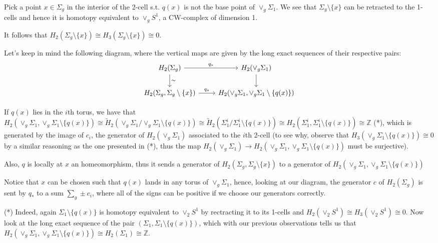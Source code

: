 \documentclass{article}
\newcommand{\numberset}{\mathbb}
\newcommand{\Z}{\numberset{Z}}
\begin{document}
Pick a point $x\in\Sigma_g$ in the interior of the 2-cell s.t. $q(x)$ is not
the base point of $\vee_g\Sigma_1$. We see that $\Sigma_g\setminus\{x\}$ can be
retracted to the 1-cells and hence it is homotopy equivalent to $\vee_g S^1$, a
CW-complex of dimension 1.

It follows that $H_2(\Sigma_g\setminus\{x\})\cong
H_3(\Sigma_g\setminus\{x\})\cong 0$.

Let's keep in mind the following diagram, where the vertical maps are given by the
long exact sequences of their respective pairs:
\[
    \begin{tikzcd}
        H_2(\Sigma_g)\arrow{r}{q_*}\arrow{d}{\sim} 
        &H_2(\vee_g\Sigma_1)\arrow{d} \\
        H_2(\Sigma_g,\Sigma_g\setminus\{x\})\arrow{r}{q_*}
        &H_2(\vee_g\Sigma_1,\vee_g\Sigma_1\setminus\{q(x)\})
    \end{tikzcd}
\]

If $q(x)$ lies in the $i$th torus, we have that
$H_2(\vee_g\Sigma_1,\vee_g\Sigma_1\setminus\{q(x)\})\cong
\tilde{H}_2(\vee_g\Sigma_1/\vee_g\Sigma_1\setminus\{q(x)\})\cong
\tilde{H}_2(\Sigma^i_1/\Sigma^i_1\setminus\{q(x)\})\cong
H_2(\Sigma^i_1,\Sigma^i_1\setminus\{q(x)\})\cong\Z$ (*), which is generated by the image of
$c_i$, the generator of $H_2(\vee_g\Sigma_1)$ associated to the $i$th 2-cell (to
see why, observe that $H_3(\vee_g\Sigma_1\setminus\{q(x)\})\cong 0$ by a similar
reasoning as the one presented in (*), thus the map 
$H_2(\vee_g\Sigma_1)\rightarrow
H_2(\vee_g\Sigma_1,\vee_g\Sigma_1\setminus\{q(x)\})$ must be surjective).

Also, $q$ is locally at $x$ an homeomorphism, thus it sends a generator of
$H_2(\Sigma_g,\Sigma_g\setminus\{x\})$ to a generator of
$H_2(\vee_g\Sigma_1,\vee_g\Sigma_1\setminus\{q(x)\})$

Notice that $x$ can be chosen such that $q(x)$ lands in any torus of
$\vee_g\Sigma_1$, hence,
looking at our diagram, the generator $c$ of $H_2(\Sigma_g)$ is sent by $q_*$ to a sum
$\sum_g\pm c_i$, where all of the
signs can be positive if we choose our generators correctly.

(*) Indeed, again $\Sigma_1\setminus\{q(x)\}$ is homotopy equivalent to $\vee_2 S^1$
by rectracting it to its 1-cells and $H_2(\vee_2 S^1)\cong H_3(\vee_2 S^1)\cong
0$. Now look at the long exact sequence of the pair
$(\Sigma_1,\Sigma_1\setminus\{q(x)\})$, which with our previous observations tells us that
$H_2(\vee_g\Sigma_1,\vee_g\Sigma_1\setminus\{q(x)\})\cong H_2(\Sigma_1)\cong\Z$.
\end{document}
